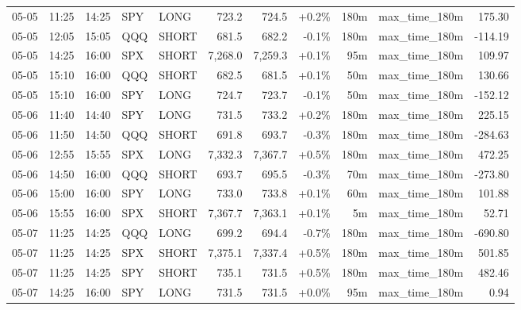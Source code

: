 \documentclass[11pt,a4paper,twoside]{article}
\begin{document}
\begin{center}
\begin{longtable}{>{\color{txtmain}}l l l l l r r r r >{\color{txtmain}}l r}
05-05 & 11:25 & 14:25 & SPY & LONG & 723.2 & 724.5 & \textcolor{wingreen}{+0.2\%} & 180m & max\_time\_180m & \textcolor{wingreen}{175.30} \\
05-05 & 12:05 & 15:05 & QQQ & SHORT & 681.5 & 682.2 & \textcolor{lossred}{-0.1\%} & 180m & max\_time\_180m & \textcolor{lossred}{-114.19} \\
05-05 & 14:25 & 16:00 & SPX & SHORT & 7,268.0 & 7,259.3 & \textcolor{wingreen}{+0.1\%} & 95m & max\_time\_180m & \textcolor{wingreen}{109.97} \\
05-05 & 15:10 & 16:00 & QQQ & SHORT & 682.5 & 681.5 & \textcolor{wingreen}{+0.1\%} & 50m & max\_time\_180m & \textcolor{wingreen}{130.66} \\
05-05 & 15:10 & 16:00 & SPY & LONG & 724.7 & 723.7 & \textcolor{lossred}{-0.1\%} & 50m & max\_time\_180m & \textcolor{lossred}{-152.12} \\
05-06 & 11:40 & 14:40 & SPY & LONG & 731.5 & 733.2 & \textcolor{wingreen}{+0.2\%} & 180m & max\_time\_180m & \textcolor{wingreen}{225.15} \\
05-06 & 11:50 & 14:50 & QQQ & SHORT & 691.8 & 693.7 & \textcolor{lossred}{-0.3\%} & 180m & max\_time\_180m & \textcolor{lossred}{-284.63} \\
05-06 & 12:55 & 15:55 & SPX & LONG & 7,332.3 & 7,367.7 & \textcolor{wingreen}{+0.5\%} & 180m & max\_time\_180m & \textcolor{wingreen}{472.25} \\
05-06 & 14:50 & 16:00 & QQQ & SHORT & 693.7 & 695.5 & \textcolor{lossred}{-0.3\%} & 70m & max\_time\_180m & \textcolor{lossred}{-273.80} \\
05-06 & 15:00 & 16:00 & SPY & LONG & 733.0 & 733.8 & \textcolor{wingreen}{+0.1\%} & 60m & max\_time\_180m & \textcolor{wingreen}{101.88} \\
05-06 & 15:55 & 16:00 & SPX & SHORT & 7,367.7 & 7,363.1 & \textcolor{wingreen}{+0.1\%} & 5m & max\_time\_180m & \textcolor{wingreen}{52.71} \\
05-07 & 11:25 & 14:25 & QQQ & LONG & 699.2 & 694.4 & \textcolor{lossred}{-0.7\%} & 180m & max\_time\_180m & \textcolor{lossred}{-690.80} \\
05-07 & 11:25 & 14:25 & SPX & SHORT & 7,375.1 & 7,337.4 & \textcolor{wingreen}{+0.5\%} & 180m & max\_time\_180m & \textcolor{wingreen}{501.85} \\
05-07 & 11:25 & 14:25 & SPY & SHORT & 735.1 & 731.5 & \textcolor{wingreen}{+0.5\%} & 180m & max\_time\_180m & \textcolor{wingreen}{482.46} \\
05-07 & 14:25 & 16:00 & SPY & LONG & 731.5 & 731.5 & \textcolor{wingreen}{+0.0\%} & 95m & max\_time\_180m & \textcolor{wingreen}{0.94} \\

\end{longtable}
\end{center}
\end{document}
